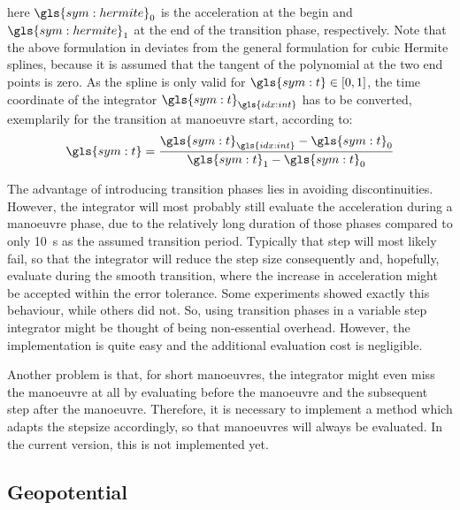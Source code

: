 here $\gls{sym:hermite}_0$ is the acceleration at the begin and $\gls{sym:hermite}_1$ at the end of the transition phase, respectively. Note that the above formulation in
 deviates from the general formulation for cubic Hermite splines, because it is assumed that the tangent of the polynomial at the two end points is zero. 
As the spline is only valid for $\gls{sym:t} \in \left[0,1\right]$, the time coordinate of the integrator $\gls{sym:t}_{\gls{idx:int}}$ has to be converted, exemplarily for the
transition at manoeuvre start, according to:
\begin{equation}
 \gls{sym:t} = \frac{\gls{sym:t}_{\gls{idx:int}} - \gls{sym:t}_0}{\gls{sym:t}_1-\gls{sym:t}_0}
\end{equation}

The advantage of introducing transition phases lies in avoiding discontinuities. However, the integrator will most probably still evaluate the acceleration during a manoeuvre
phase, due to the relatively long duration of those phases compared to only \SI{10}{\second} as the assumed transition period. Typically that step will most likely fail, so that
the integrator will reduce the step size consequently and, hopefully, evaluate during the smooth transition, where the increase in acceleration might be accepted within the error
tolerance. Some experiments showed exactly this behaviour, while others did not. So, using transition phases in a variable step integrator might be thought of being non-essential
overhead. However, the implementation is quite easy and the additional evaluation cost is negligible.

Another problem is that, for short manoeuvres, the integrator might even miss the manoeuvre at all by evaluating before the manoeuvre and the subsequent step after the manoeuvre.
Therefore, it is necessary to implement a method which adapts the stepsize accordingly, so that manoeuvres will always be evaluated. In the current \neptune version, this is not
implemented yet.

\subsection{Geopotential}
\label{sec:propagation-state-geopotential}

